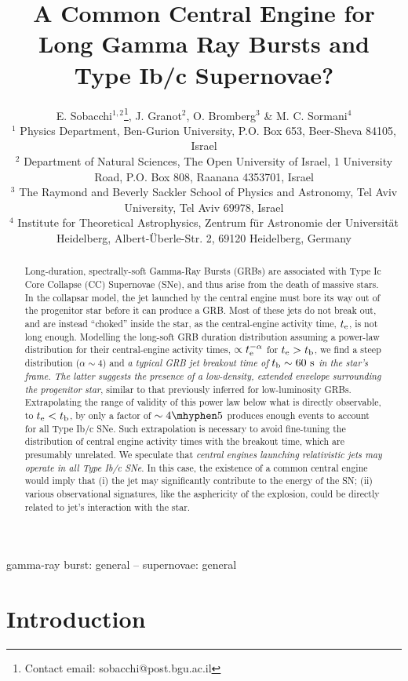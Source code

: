 \documentclass[useAMS,usenatbib]{mn2e}
\title[Long GRBs and Type Ib/c SNe
]{
A Common Central Engine for Long Gamma Ray Bursts and Type Ib/c Supernovae?
}
\author[Sobacchi, Granot, Bromberg \& Sormani]{E. Sobacchi$^{1,2}$\thanks{Contact email: sobacchi@post.bgu.ac.il}, J. Granot$^2$, O. Bromberg$^3$ \& M. C. Sormani$^4$\\
$^1$ Physics Department, Ben-Gurion University, P.O. Box 653, Beer-Sheva 84105, Israel\\
$^2$ Department of Natural Sciences, The Open University of Israel, 1 University Road, P.O. Box 808, Raanana 4353701, Israel\\
$^3$  The Raymond and Beverly Sackler School of Physics and Astronomy, Tel Aviv University, Tel Aviv 69978, Israel\\
$^4$ Institute for Theoretical Astrophysics, Zentrum f\"{u}r Astronomie der Universit\"{a}t Heidelberg, Albert-\"{U}berle-Str. 2, 69120 Heidelberg, Germany
}
\begin{document}
\date{}

\newcommand{\degree}{\ensuremath{^\circ}}

\maketitle

\begin{abstract}
Long-duration, spectrally-soft Gamma-Ray Bursts (GRBs) are associated with Type Ic Core Collapse (CC) Supernovae (SNe), and thus arise from the death of massive stars. In the collapsar model, the jet launched by the central engine must bore its way out of the progenitor star before it can produce a GRB. Most of these jets do not break out, and are instead ``choked'' inside the star, as the central-engine activity time, $t_{\rm e}$, is not long enough.
%
Modelling the long-soft GRB duration distribution assuming a power-law distribution for their central-engine activity times, $\propto t_{\rm e}^{-\alpha}$ for $t_{\rm e}>t_{\rm b}$,
we find a steep distribution ($\alpha\sim4$) and {\it a typical GRB jet breakout time of }$t_{\rm b}\sim 60\text{ s}$ {\it in the star's frame. The latter suggests the presence of a low-density, extended envelope surrounding the progenitor star}, similar to that previously inferred for low-luminosity GRBs.
%
Extrapolating the range of validity of this power law below what is directly observable, to  $t_{\rm e}<t_{\rm b}$, by only a factor of $\sim4 \mhyphen 5$ produces enough events to account for all Type Ib/c SNe. Such extrapolation is necessary to avoid fine-tuning the distribution of central engine activity times with the breakout time, which are presumably unrelated.
%
We speculate that {\it central engines launching relativistic jets may operate in all Type Ib/c SNe}. In this case, the existence of a common central engine would imply that (i) the jet may significantly contribute to the energy of the SN; (ii) various observational signatures, like the asphericity of the explosion, could be directly related to jet's interaction with the star.
\end{abstract}

\begin{keywords}
gamma-ray burst: general -- supernovae: general
\end{keywords}

\section{Introduction}
\label{sec:introduction}
\end{document}
